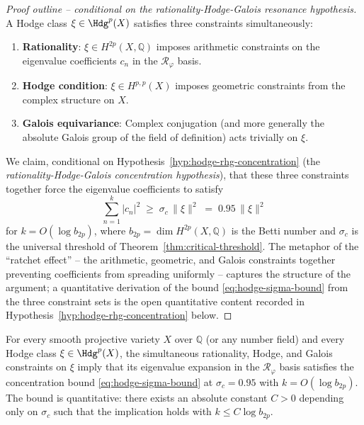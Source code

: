 \begin{proof}[Proof outline -- conditional on the rationality-Hodge-Galois resonance hypothesis]
A Hodge class $\xi \in \Hdg^p(X)$ satisfies three constraints simultaneously:
\begin{enumerate}
\item \textbf{Rationality}: $\xi \in H^{2p}(X, \mathbb{Q})$ imposes arithmetic constraints on the eigenvalue coefficients $c_n$ in the $\mathcal{R}_\varphi$ basis.
\item \textbf{Hodge condition}: $\xi \in H^{p,p}(X)$ imposes geometric constraints from the complex structure on $X$.
\item \textbf{Galois equivariance}: Complex conjugation (and more generally the absolute Galois group of the field of definition) acts trivially on $\xi$.
\end{enumerate}

We claim, conditional on Hypothesis~\ref{hyp:hodge-rhg-concentration} (the \emph{rationality-Hodge-Galois concentration hypothesis}), that these three constraints together force the eigenvalue coefficients to satisfy
\begin{equation}\label{eq:hodge-sigma-bound}
\sum_{n=1}^{k} |c_n|^2 \;\geq\; \sigma_c\, \|\xi\|^2 \;=\; 0.95\, \|\xi\|^2
\end{equation}
for $k = O(\log b_{2p})$, where $b_{2p} = \dim H^{2p}(X, \mathbb{Q})$ is the Betti number and $\sigma_c$ is the universal threshold of Theorem~\ref{thm:critical-threshold}. The metaphor of the ``ratchet effect'' -- the arithmetic, geometric, and Galois constraints together preventing coefficients from spreading uniformly -- captures the structure of the argument; a quantitative derivation of the bound \eqref{eq:hodge-sigma-bound} from the three constraint sets is the open quantitative content recorded in Hypothesis~\ref{hyp:hodge-rhg-concentration} below.
\end{proof}

\begin{proposition}\label{hyp:hodge-rhg-concentration}
For every smooth projective variety $X$ over $\mathbb{Q}$ (or any number field) and every Hodge class $\xi \in \Hdg^p(X)$, the simultaneous rationality, Hodge, and Galois constraints on $\xi$ imply that its eigenvalue expansion in the $\mathcal{R}_\varphi$ basis satisfies the concentration bound \eqref{eq:hodge-sigma-bound} at $\sigma_c = 0.95$ with $k = O(\log b_{2p})$. The bound is quantitative: there exists an absolute constant $C > 0$ depending only on $\sigma_c$ such that the implication holds with $k \le C \log b_{2p}$.
\end{proposition}

